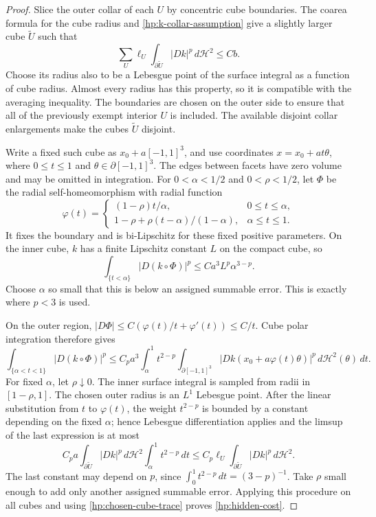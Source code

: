 \documentclass[11pt]{article}
\numberwithin{equation}{section}
\theoremstyle{definition}
\theoremstyle{remark}
\begin{document}
\begin{proof}
Slice the outer collar of each $U$ by concentric cube boundaries.
The coarea formula for the cube radius and
\eqref{hp:k-collar-assumption} give a slightly larger cube
$\widetilde U$ such that
\begin{equation}\label{hp:chosen-cube-trace}
 \sum_U\ell_U\int_{\partial\widetilde U}|Dk|^p\,d\mathcal H^2
                   \leq Cb.
\end{equation}
Choose its radius also to be a Lebesgue point of the surface integral
as a function of cube radius.  Almost every radius has this property,
so it is compatible with the averaging inequality.  The boundaries
are chosen on the outer side to ensure that all of the previously
exempt interior $U$ is included.  The available disjoint collar
enlargements make the cubes $\widetilde U$ disjoint.

Write a fixed such cube as $x_0+a[-1,1]^3$, and use coordinates
$x=x_0+at\theta$, where $0\leq t\leq1$ and
$\theta\in\partial[-1,1]^3$.  The edges between facets have zero
volume and may be omitted in integration.  For $0<\alpha<1/2$
and $0<\rho<1/2$, let $\Phi$ be the radial self-homeomorphism
with radial function
\[
 \varphi(t)=
 \begin{cases}
 (1-\rho)t/\alpha,&0\leq t\leq\alpha,\\[2pt]
 1-\rho+\rho(t-\alpha)/(1-\alpha),&\alpha\leq t\leq1.
 \end{cases}
\]
It fixes the boundary and is bi-Lipschitz for these fixed positive
parameters.  On the inner cube, $k$ has a finite Lipschitz constant
$L$ on the compact cube, so
\[
 \int_{\{t<\alpha\}}|D(k\circ\Phi)|^p
                  \leq C a^3 L^p\alpha^{3-p}.
\]
Choose $\alpha$ so small that this is below an assigned summable
error.  This is exactly where $p<3$ is used.

On the outer region,
$|D\Phi|\leq C(\varphi(t)/t+\varphi'(t))\leq C/t$.
Cube polar integration therefore gives
\[
 \int_{\{\alpha<t<1\}}|D(k\circ\Phi)|^p
 \leq C_pa^3\int_\alpha^1t^{2-p}
       \int_{\partial[-1,1]^3}
          |Dk(x_0+a\varphi(t)\theta)|^p\,d\mathcal H^2(\theta)\,dt.
\]
For fixed $\alpha$, let $\rho\downarrow0$.  The inner surface
integral is sampled from radii in $[1-\rho,1]$.  The chosen outer
radius is an $L^1$ Lebesgue point.  After the linear substitution
from $t$ to $\varphi(t)$, the weight $t^{2-p}$ is bounded by a
constant depending on the fixed $\alpha$; hence Lebesgue
differentiation applies and the limsup of the last expression is
at most
\[
 C_pa\int_{\partial\widetilde U}|Dk|^p\,d\mathcal H^2
                   \int_\alpha^1t^{2-p}\,dt
 \leq C_p\ell_U\int_{\partial\widetilde U}|Dk|^p\,d\mathcal H^2.
\]
The last constant may depend on $p$, since
$\int_0^1t^{2-p}\,dt=(3-p)^{-1}$.  Take $\rho$ small enough to
add only another assigned summable error.  Applying this procedure
on all cubes and using \eqref{hp:chosen-cube-trace} proves
\eqref{hp:hidden-cost}.


\end{proof}
\end{document}
